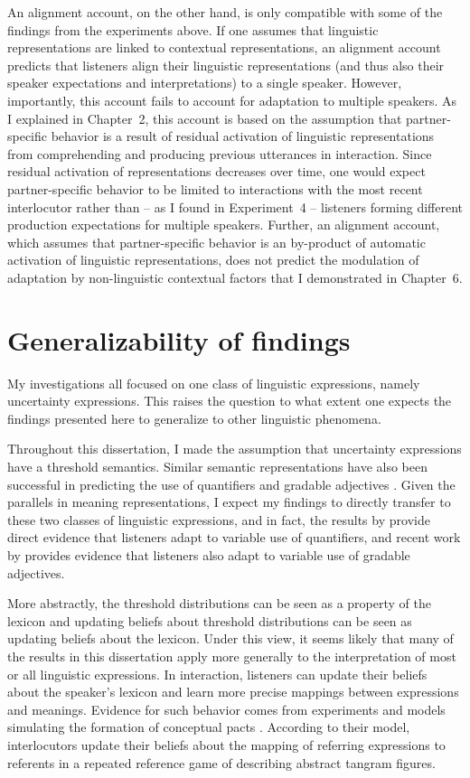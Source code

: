 An alignment account, on the other hand, is only compatible with some of the findings from the experiments above. If one assumes that linguistic representations are linked to contextual representations,  an alignment account predicts that listeners align their linguistic representations (and thus also their speaker expectations and interpretations) to a single speaker. However, importantly, this account fails to account for adaptation to multiple speakers. As I explained in Chapter~2, this account is based on the assumption that partner-specific behavior is a result of residual activation of linguistic representations from comprehending and producing previous utterances in interaction. Since residual activation  of representations decreases over time, one would expect partner-specific behavior to be limited to interactions with the most recent interlocutor rather than -- as I found in Experiment~4 -- listeners forming different production expectations for multiple speakers. Further, an alignment account, which assumes that partner-specific behavior is an by-product of automatic activation of linguistic representations, does not predict the modulation of adaptation by non-linguistic contextual factors that I demonstrated in Chapter~6. 

\section{Generalizability of findings}

My investigations all focused on one class of linguistic expressions, namely uncertainty expressions. This raises the question
to what extent one expects the findings presented here to generalize to other linguistic phenomena.

Throughout this dissertation, I made the assumption that uncertainty expressions have a threshold semantics. Similar semantic
representations have also been successful in predicting the use of quantifiers  and gradable adjectives . Given
the parallels in meaning representations, I expect my findings to directly transfer to these two classes of linguistic expressions, and in fact, 
the results by \textcite{Yildirim2016} provide direct evidence that listeners adapt to variable use of quantifiers, and recent work by \textcite{Xiang2020} 
provides evidence that listeners also adapt to variable use of gradable adjectives.

More abstractly, the threshold distributions can be seen as a property of the lexicon and updating beliefs about threshold distributions can be seen as
updating beliefs about the lexicon. Under this view, it seems likely that many of the results in this dissertation apply more generally to the interpretation of most or all linguistic expressions.
In interaction, listeners can update their beliefs about the speaker's lexicon and learn more precise mappings between expressions and meanings. Evidence for such behavior comes from  experiments and models simulating the formation of conceptual pacts \cite{Hawkins2017}. According to their model, interlocutors update their beliefs about the mapping of referring expressions
to referents in a repeated reference game of describing abstract tangram figures.

